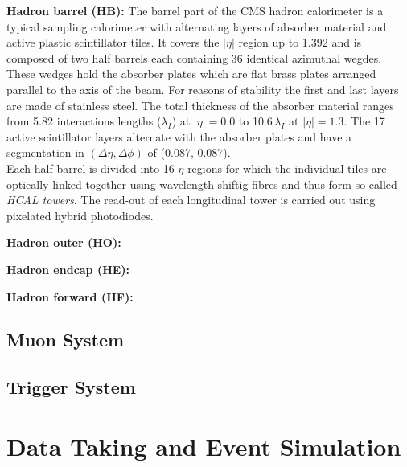 \begin{description}
 \item \textbf{Hadron barrel (HB):} The barrel part of the CMS hadron calorimeter is a typical sampling calorimeter with alternating layers of absorber material and active plastic scintillator tiles. It covers the $|\eta|$ region up to 1.392 and is composed of two half barrels each containing 36 identical azimuthal wegdes. These wedges hold the absorber plates which are flat brass plates arranged parallel to the axis of the beam. For reasons of stability the first and last layers are made of stainless steel. The total thickness of the absorber material ranges from 5.82 interactions lengths ($\lambda_I$) at $|\eta| = 0.0$ to 10.6\,$\lambda_I$ at $|\eta| = 1.3$. The 17 active scintillator layers alternate with the absorber plates and have a segmentation in $(\Delta \eta, \Delta \phi)$ of (0.087, 0.087).\\
Each half barrel is divided into 16 $\eta$-regions for which the individual tiles are optically linked together using wavelength shiftig fibres and thus form so-called \textit{HCAL towers}. The read-out of each longitudinal tower is carried out using pixelated hybrid photodiodes.
 \item \textbf{Hadron outer (HO):}
 \item \textbf{Hadron endcap (HE):}
 \item \textbf{Hadron forward (HF):}
\end{description}

\subsection{Muon System}
\label{subsec:cms_muon}

\subsection{Trigger System}
\label{subsec:cms_trigger}

\section{Data Taking and Event Simulation}
\label{sec:data}
